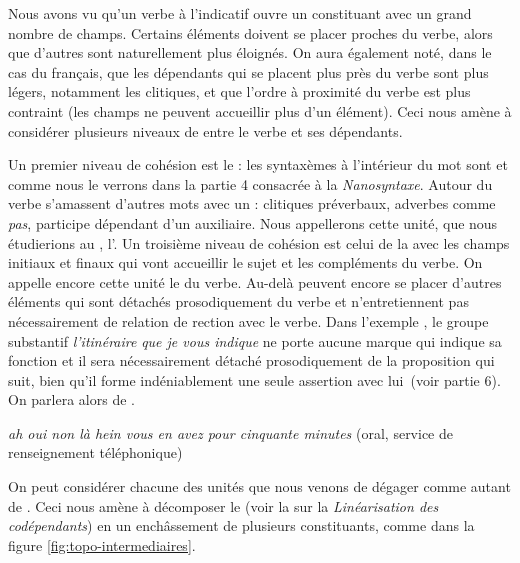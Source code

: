 Nous avons vu qu’un verbe à l’indicatif ouvre un constituant avec un grand nombre de champs. Certains éléments doivent se placer proches du verbe, alors que d’autres sont naturellement plus éloignés. On aura également noté, dans le cas du français, que les dépendants qui se placent plus près du verbe sont plus légers, notamment les clitiques, et que l’ordre à proximité du verbe est plus contraint (les champs ne peuvent accueillir plus d’un élément). Ceci nous amène à considérer plusieurs niveaux de  entre le verbe et ses dépendants.

Un premier niveau de cohésion est le  : les syntaxèmes à l’intérieur du mot sont  et  comme nous le verrons dans la partie 4 consacrée à la \textit{Nanosyntaxe}. Autour du verbe s’amassent d’autres mots avec un : clitiques préverbaux, adverbes comme \textit{pas}, participe dépendant d’un auxiliaire. Nous appellerons cette unité, que nous étudierions au , l’. Un troisième niveau de cohésion est celui de la  avec les champs initiaux et finaux qui vont accueillir le sujet et les compléments du verbe. On appelle encore cette unité le  du verbe. Au-delà peuvent encore se placer d’autres éléments qui sont détachés prosodiquement du verbe et n’entretiennent pas nécessairement de relation de rection avec le verbe. Dans l’exemple , le groupe substantif \textit{l’itinéraire} \textit{que je vous indique} ne porte aucune marque qui indique sa fonction et il sera nécessairement détaché prosodiquement de la proposition qui suit, bien qu’il forme indéniablement une seule assertion avec lui~(voir partie 6). On parlera alors de .

\ea\label{ex:ratp}
{\itshape
 ah oui non là   {hein vous en avez pour cinquante minutes}} (oral, service de renseignement téléphonique)
\z



On peut considérer chacune des unités que nous venons de dégager comme autant de . Ceci nous amène à décomposer le  (voir la  sur la \textit{Linéarisation des codépendants}) en un enchâssement de plusieurs constituants, comme dans la figure \ref{fig:topo-intermediaires}.


